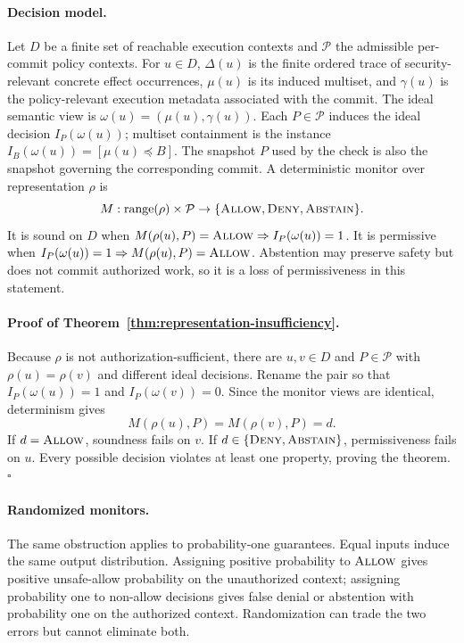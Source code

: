 \documentclass[letterpaper,twocolumn,10pt]{article}
\newcommand{\Allow}{\textnormal{\textsc{Allow}}}
\newcommand{\Deny}{\textnormal{\textsc{Deny}}}
\newcommand{\Abstain}{\textnormal{\textsc{Abstain}}}
\theoremstyle{definition}
\begin{document}
\paragraph{Decision model.}
Let $D$ be a finite set of reachable execution contexts and $\mathcal{P}$ the
admissible per-commit policy contexts.  For $u\in D$, $\Delta(u)$ is
the finite ordered trace of security-relevant concrete effect occurrences,
$\mu(u)$ is its induced multiset, and $\gamma(u)$ is the policy-relevant
execution metadata associated with the commit.  The ideal semantic view is
$\omega(u)=(\mu(u),\gamma(u))$.  Each $P\in\mathcal P$ induces the ideal
decision $I_P(\omega(u))$; multiset containment is the instance
$I_B(\omega(u))=[\mu(u)\preceq B]$.  The snapshot $P$ used by the check is also the
snapshot governing the corresponding commit.  A deterministic monitor over
representation
$\rho$ is
\[
  M:\mathrm{range}(\rho)\times\mathcal P
  \rightarrow\{\Allow,\Deny,\Abstain\}.
\]
It is sound on $D$ when $M(\rho(u),P)=\Allow\Rightarrow I_P(\omega(u))=1$.
It is permissive when $I_P(\omega(u))=1\Rightarrow
M(\rho(u),P)=\Allow$.  Abstention may
preserve safety but does not commit authorized work, so it is a loss of
permissiveness in this statement.

\paragraph{Proof of Theorem~\ref{thm:representation-insufficiency}.}
Because $\rho$ is not authorization-sufficient, there are $u,v\in D$ and
$P\in\mathcal P$ with $\rho(u)=\rho(v)$ and different ideal decisions. Rename
the pair so that $I_P(\omega(u))=1$ and $I_P(\omega(v))=0$. Since the monitor views are
identical, determinism gives
\[
 M(\rho(u),P)=M(\rho(v),P)=d.
\]
If $d=\Allow$, soundness fails on $v$. If $d\in\{\Deny,\Abstain\}$,
permissiveness fails on $u$. Every possible decision violates at least one
property, proving the theorem. \hfill$\square$

\paragraph{Randomized monitors.}
The same obstruction applies to probability-one guarantees. Equal inputs
induce the same output distribution. Assigning positive probability to
$\Allow$ gives positive unsafe-allow probability on the unauthorized context;
assigning probability one to non-allow decisions gives false denial or
abstention with probability one on the authorized context. Randomization can
trade the two errors but cannot eliminate both.
\end{document}
